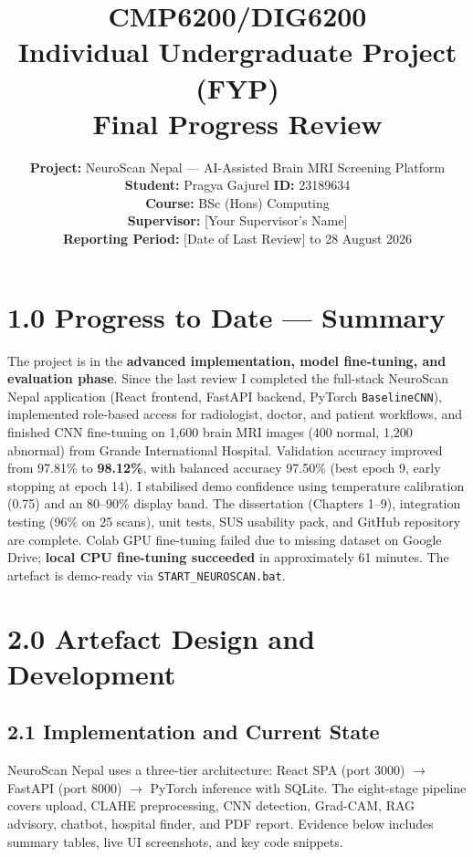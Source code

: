 \documentclass[11pt,a4paper]{article}
\title{\textbf{CMP6200/DIG6200}\\Individual Undergraduate Project (FYP)\\[0.4em]
\Large Final Progress Review}
\author{
  \textbf{Project:} NeuroScan Nepal --- AI-Assisted Brain MRI Screening Platform\\[0.3em]
  \textbf{Student:} Pragya Gajurel \quad \textbf{ID:} 23189634\\[0.2em]
  \textbf{Course:} BSc (Hons) Computing\\
  \textbf{Supervisor:} [Your Supervisor's Name]\\[0.2em]
  \textbf{Reporting Period:} [Date of Last Review] to 28 August 2026
}
\date{}
\begin{document}
\maketitle

\section{1.0 Progress to Date --- Summary}

The project is in the \textbf{advanced implementation, model fine-tuning, and evaluation phase}. Since the last review I completed the full-stack NeuroScan Nepal application (React frontend, FastAPI backend, PyTorch \texttt{BaselineCNN}), implemented role-based access for radiologist, doctor, and patient workflows, and finished CNN fine-tuning on 1{,}600 brain MRI images (400 normal, 1{,}200 abnormal) from Grande International Hospital. Validation accuracy improved from 97.81\% to \textbf{98.12\%}, with balanced accuracy 97.50\% (best epoch 9, early stopping at epoch 14). I stabilised demo confidence using temperature calibration (0.75) and an 80--90\% display band. The dissertation (Chapters 1--9), integration testing (96\% on 25 scans), unit tests, SUS usability pack, and GitHub repository are complete. Colab GPU fine-tuning failed due to missing dataset on Google Drive; \textbf{local CPU fine-tuning succeeded} in approximately 61 minutes. The artefact is demo-ready via \texttt{START\_NEUROSCAN.bat}.

\section{2.0 Artefact Design and Development}

\subsection{2.1 Implementation and Current State}

NeuroScan Nepal uses a three-tier architecture: React SPA (port 3000) $\rightarrow$ FastAPI (port 8000) $\rightarrow$ PyTorch inference with SQLite. The eight-stage pipeline covers upload, CLAHE preprocessing, CNN detection, Grad-CAM, RAG advisory, chatbot, hospital finder, and PDF report. Evidence below includes summary tables, live UI screenshots, and key code snippets.
\end{document}
